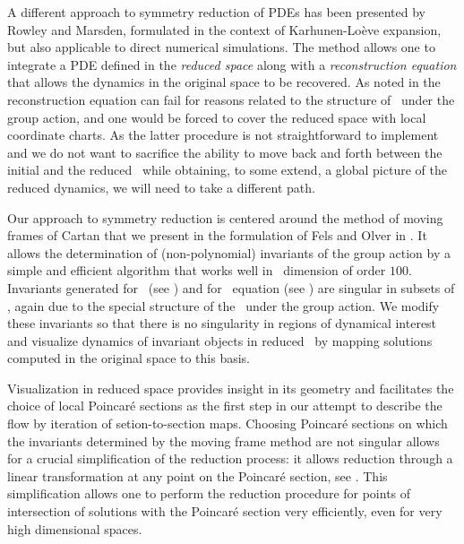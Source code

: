 A different approach to symmetry reduction of PDEs has been
presented by Rowley and
Marsden, formulated in the
context of {Karhunen-Lo\`{e}ve} expansion, but also applicable
to direct numerical simulations.
The method allows one to integrate a PDE defined in the
\emph{reduced space} along with a \emph{reconstruction
equation} that allows the dynamics in the original space to
be recovered. As noted in
 the reconstruction
equation can fail for reasons related to the structure of
\statesp\ under the group action,
and one would be forced to cover the reduced space with local
coordinate charts. As the latter procedure is not
straightforward to implement and we do not want to sacrifice
the ability to move back and forth between the initial and
the reduced \statesp\, while obtaining, to some extend, a global
picture of the reduced dynamics, we will need to take a different path.

Our approach to symmetry reduction is centered around the
method of moving frames of Cartan that we
present in the formulation of Fels and Olver
in . It allows the determination of
(non-polynomial) invariants of the group action by a simple
and efficient algorithm that works well in \statesp\
dimension of order $100$. Invariants generated for \CLe\ (see
) and for \KS\ equation (see
) are singular in subsets of \statesp,
again due to the special structure of the \statesp\ under the
group action. We modify these invariants so that there is no
singularity in regions of dynamical interest and visualize
dynamics of invariant objects in reduced \statesp\ by mapping
solutions computed in the original space to this basis.


Visualization in reduced space provides insight in its
geometry and facilitates the choice of local Poincar\'e
sections as the first step in our attempt to describe the
flow by iteration of setion-to-section maps.
Choosing Poincar\'e sections on which the invariants
determined by the moving frame method are not singular allows
for a crucial simplification of the reduction process: it
allows reduction through a linear transformation at
any point on the Poincar\'e section, see .
This simplification allows one to perform the reduction
procedure for points of intersection of solutions with the
Poincar\'e section very efficiently, even for very high
dimensional spaces.

